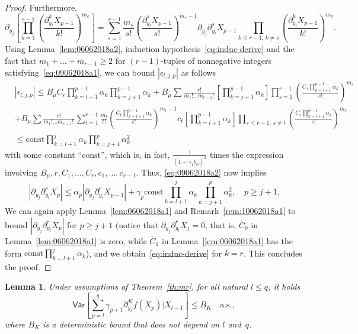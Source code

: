 \documentclass[article]{elsarticle}
\newtheorem{lem}[thm]{Lemma}
\newcommand*{\const}{\mathrm{const}}
\newcommand*{\ol}{\overline}
\begin{document}
\begin{proof}
Furthermore,
\[
\partial_{y_{j}}\left[\prod_{k=1}^{r-1}\left(\frac{\partial_{y_{l}}^{k}X_{p-1}}{k!}\right)^{m_{k}}\right]=\sum_{s=1}^{r-1}\frac{m_{s}}{s!}\left(\frac{\partial_{y_{l}}^{s}X_{p-1}}{s!}\right)^{m_{s}-1}\partial_{y_{j}}\partial_{y_{l}}^{s}X_{p-1}\prod_{k\le r-1,\,k\neq s}\left(\frac{\partial_{y_{l}}^{k}X_{p-1}}{k!}\right)^{m_{k}}.
\]
Using Lemma~\ref{lem:06062018a2},
induction hypothesis~\eqref{eq:induc-derive}
and the fact that $m_{1}+\ldots+m_{r-1}\ge2$
for $(r-1)$-tuples of nonnegative integers
satisfying~\eqref{eq:09062018a1},
we can bound $|\epsilon_{l,j,p}|$ as follows
\begin{align*}
&\left|\epsilon_{l,j,p}\right|  \leq  B_{\mu}C_{r}\prod_{k=l+1}^{p-1}\alpha_{k}\prod_{k=j+1}^{p-1}\alpha_{k}+B_{\mu}\sum\frac{r!}{m_{1}!\ldots m_{r-1}!\,}\left[\prod_{k=j+1}^{p-1}\alpha_{k}\right]\prod_{s=1}^{r-1}\left(\frac{C_{s}\prod_{k=l+1}^{p-1}\alpha_{k}}{s!}\right)^{m_{s}}\\
&+B_{\mu}\sum\frac{r!}{m_{1}!\ldots m_{r-1}!\,}\sum_{t=1}^{r-1}\frac{m_t}{t!}\left(\frac{C_{t}\prod_{k=l+1}^{p-1}\alpha_{k}}{t!}\right)^{m_{t}-1}
c_t\left[\prod_{k=l+1}^{p-1}\alpha_{k}\right]\prod_{s\le r-1,\,s\neq t}\left(\frac{C_{s}\prod_{k=l+1}^{p-1}\alpha_{k}}{s!}\right)^{m_{s}}\\
& \leq \const\prod_{k=l+1}^{j}\alpha_{k}\prod_{k=j+1}^{p}\alpha_{k}^{2}
\end{align*}
with some constant ``$\const$'',
which is, in fact, $\frac1{(1-\gamma_1 b_\mu)^2}$ times
the expression involving
$B_\mu,r,C_1,\ldots,C_r,c_1,\ldots,c_{r-1}$.
Thus, \eqref{eq:09062018a2} now implies
$$
|\partial_{y_{j}}\partial_{y_{l}}^{r}X_{p}|
\le\alpha_p|\partial_{y_{j}}\partial_{y_{l}}^{r}X_{p-1}|
+\gamma_p \const\prod_{k=l+1}^{j}\alpha_{k}\prod_{k=j+1}^{p}\alpha_{k}^{2},
\quad p\ge j+1.
$$
We can again apply Lemma~\ref{lem:06062018a1}
and Remark~\ref{rem:10062018a1}
to bound $|\partial_{y_{j}}\partial_{y_{l}}^r X_{p}|$
for $p\ge j+1$
(notice that $\partial_{y_j}\partial_{y_l}^r X_j=0$, that is,
$\ol C_0$ in Lemma~\ref{lem:06062018a1} is zero,
while $\ol C_1$ in Lemma~\ref{lem:06062018a1}
has the form $\const\prod_{k=l+1}^j \alpha_k$),
and we obtain~\eqref{eq:induc-derive} for $k=r$.
This concludes the proof.
\end{proof}

\begin{lem}
\label{lem:var_poincare}
Under assumptions of Theorem~\ref{th:mr},
for all natural $l\le q$, it holds
$$
\mathsf{Var}\left[\sum_{p=l}^{q}\gamma_{p+1}\partial_{y_{l}}^{K}f\left(X_{p}\right)\Big|X_{l-1}\right]\le B_K\quad\text{a.s.},
$$
where $B_K$ is a deterministic bound that does not depend on $l$ and~$q$.
\end{lem}
\end{document}
